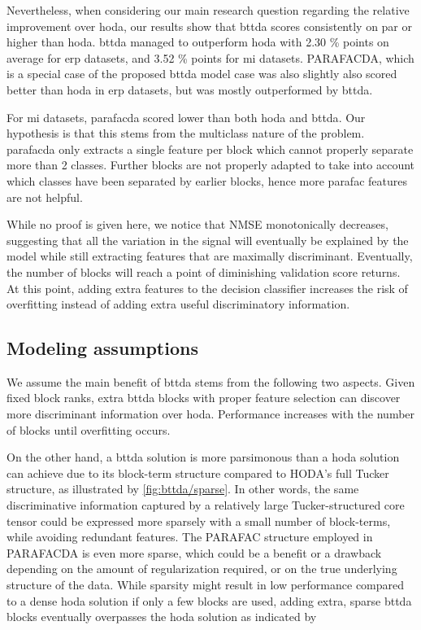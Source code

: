 \documentclass[twocolumn]{article}
\begin{document}
	Nevertheless, when considering our main research question regarding the
	relative improvement over \ac{hoda}, our results show that
	\ac{bttda} scores consistently on par or higher than \ac{hoda}.
	\Ac{bttda} managed to outperform \ac{hoda} with 2.30 \% points on average for
	\ac{erp} datasets, and 3.52 \% points for \ac{mi} datasets.
	PARAFACDA, which is a special case of the proposed \ac{bttda} model
	case was also slightly also scored better than  \ac{hoda} in \ac{erp} datasets,
	but was mostly outperformed by \ac{bttda}.

	For \ac{mi} datasets, \ac{parafacda} scored lower than both \ac{hoda} and \ac{bttda}.
	Our hypothesis is that this stems from the multiclass nature of the problem.
	\Ac{parafacda} only extracts a single feature per block which cannot properly
	separate more than 2 classes.
	Further blocks are not properly adapted to take into account which classes
	have been separated by earlier blocks, hence more \ac{parafac} features
	are not helpful.

	While no proof is given here, we notice that NMSE monotonically decreases,
	suggesting that all the variation in the signal will eventually be explained
	by the model while still extracting features that are maximally discriminant.
	Eventually, the number of blocks will reach a point of diminishing validation
	score returns.
	At this point, adding extra features to the decision classifier increases
	the risk of overfitting instead of adding extra useful discriminatory
	information.





	\subsection{Modeling assumptions}

	We assume the main benefit of \ac{bttda} stems from the following two aspects.
	Given fixed block ranks, extra \ac{bttda} blocks with proper feature selection
	can discover more discriminant information over \ac{hoda}.
	Performance increases with the number of blocks until overfitting occurs.

	On the other hand, a \ac{bttda} solution is more parsimonous than a \ac{hoda}
	solution can achieve due to its block-term structure compared to HODA's full Tucker
	structure, as illustrated	by \cref{fig:bttda/sparse}.
	In other words, the same discriminative information captured by a relatively large
	Tucker-structured core tensor could be expressed more sparsely with a small
	number of block-terms, while avoiding redundant features.
	The PARAFAC structure employed in PARAFACDA is even more sparse, which could be
	a benefit or a drawback depending on the amount of regularization required,
	or on the true underlying structure of the data.
	While sparsity might result in low performance compared to a dense \ac{hoda}
	solution if only a few blocks are used, adding extra, sparse \ac{bttda}
	blocks  eventually overpasses the \ac{hoda} solution as indicated by
\end{document}
